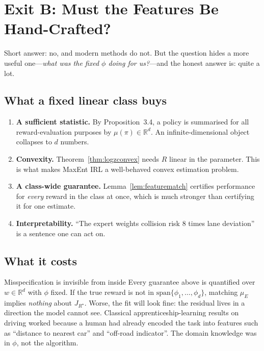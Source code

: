 \documentclass[11pt]{article}
\theoremstyle{plain}
\theoremstyle{definition}
\theoremstyle{remark}
\newcommand{\R}{\mathbb{R}}
\begin{document}
\section{Exit B: Must the Features Be Hand-Crafted?}
\label{sec:exitb}

Short answer: no, and modern methods do not. But the question hides a more
useful one---\emph{what was the fixed $\phi$ doing for us?}---and the
honest answer is: quite a lot.

\subsection{What a fixed linear class buys}

\begin{enumerate}
\item \textbf{A sufficient statistic.} By Proposition~3.4, a policy is
summarised for all reward-evaluation purposes by $\mu(\pi)\in\R^d$. An
infinite-dimensional object collapses to $d$ numbers.
\item \textbf{Convexity.} Theorem~\ref{thm:logzconvex} needs $R$ linear in
the parameter. This is what makes MaxEnt IRL a well-behaved convex
estimation problem.
\item \textbf{A class-wide guarantee.} Lemma~\ref{lem:featurematch}
certifies performance for \emph{every} reward in the class at once, which
is much stronger than certifying it for one estimate.
\item \textbf{Interpretability.} ``The expert weights collision risk 8
times lane deviation'' is a sentence one can act on.
\end{enumerate}

\subsection{What it costs}

\begin{redbox}{Misspecification is invisible from inside}
Every guarantee above is quantified over $w\in\R^d$ with $\phi$ fixed. If
the true reward is not in $\mathrm{span}\{\phi_1,\ldots,\phi_d\}$,
matching $\mu_E$ implies \emph{nothing} about $J_{R^\star}$. Worse, the fit
will look fine: the residual lives in a direction the model cannot see.
Classical apprenticeship-learning results on driving worked because a
human had already encoded the task into features such as ``distance to
nearest car'' and ``off-road indicator''. The domain knowledge was in
$\phi$, not the algorithm.
\end{redbox}
\end{document}
